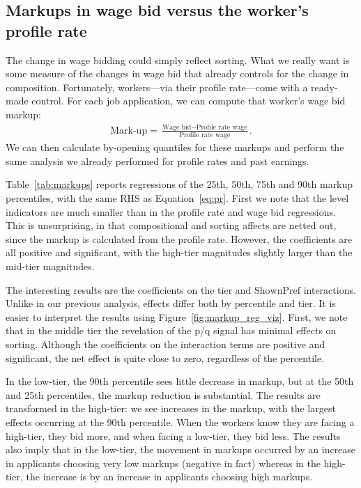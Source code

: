 \subsection{Markups in wage bid versus the worker's profile rate} 

The change in wage bidding could simply reflect sorting. 
What we really want is some measure of the changes in wage bid that already controls for the change in composition.
Fortunately, workers---via their profile rate---come with a ready-made control.
For each job application, we can compute that worker's wage bid markup: 
\begin{align} \label{eq:markup}
\mbox{Mark-up} = \frac{\mbox{Wage bid} - \mbox{Profile rate wage}}{\mbox{Profile rate wage}}.   
\end{align} 
We can then calculate by-opening quantiles for these markups and perform the same analysis we already performed for profile rates and past earnings. 

Table~\ref{tab:markups} reports regressions of the 25th, 50th, 75th and 90th markup percentiles, with the same RHS as Equation~\ref{eq:pr}.
First we note that the level indicators are much smaller than in the profile rate and wage bid regressions. 
This is unsurprising, in that compositional and sorting affects are netted out, since the markup is calculated from the profile rate. 
However, the coefficients are all positive and significant, with the high-tier magnitudes slightly larger than the mid-tier magnitudes. 



The interesting results are the coefficients on the tier and $\mbox{ShownPref}$ interactions.
Unlike in our previous analysis, effects differ both by percentile and tier.
It is easier to interpret the results using Figure~\ref{fig:markup_reg_viz}. 
First, we note that in the middle tier the revelation of the p/q signal has minimal effects on sorting.
Although the coefficients on the interaction terms are positive and significant, the net effect is quite close to zero, regardless of the percentile.

In the low-tier, the 90th percentile sees little decrease in markup, but at the 50th and 25th percentiles, the markup reduction is substantial.
The results are transformed in the high-tier: we see increases in the markup, with the largest effects occurring at the 90th percentile.
When the workers know they are facing a high-tier, they bid more, and when facing a low-tier, they bid less.
The results also imply that in the low-tier, the movement in markups occurred by an increase in applicants choosing very low markups (negative in fact) whereas in the high-tier, the increase is by an increase in applicants choosing high markups.   


